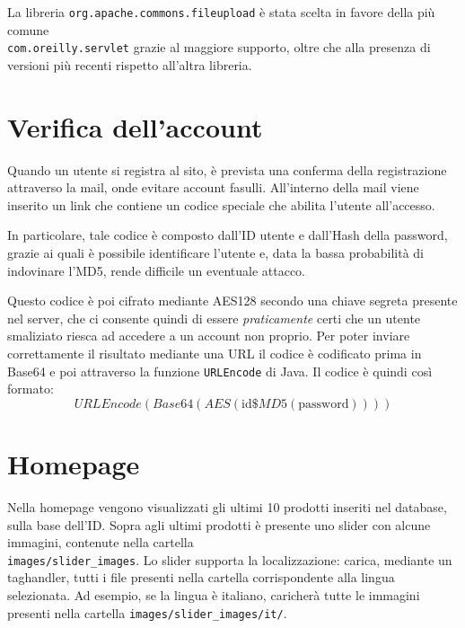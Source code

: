La libreria \texttt{org.apache.commons.fileupload} è stata scelta in favore della più comune \\\texttt{com.oreilly.servlet} grazie al maggiore supporto, oltre che alla presenza di versioni più recenti rispetto all'altra libreria.



\chapter{Verifica dell'account}

Quando un utente si registra al sito, è prevista una conferma della registrazione attraverso la mail, onde evitare account fasulli. All'interno della mail viene inserito un link che contiene un codice speciale che abilita l'utente all'accesso.

In particolare, tale codice è composto dall'ID utente e dall'Hash della password, grazie ai quali è possibile identificare l'utente e, data la bassa probabilità di indovinare l'MD5, rende difficile un eventuale attacco.

Questo codice è poi cifrato mediante AES128 secondo una chiave segreta presente nel server, che ci consente quindi di essere \textit{praticamente} certi che un utente smaliziato riesca ad accedere a un account non proprio. Per poter inviare correttamente il risultato mediante una URL il codice è codificato prima in Base64 e poi attraverso la funzione \texttt{URLEncode} di Java. Il codice è quindi così formato:
\[
    URLEncode( Base64( AES( \mbox{id}\$MD5(\mbox{password}))))
\]

\chapter{Homepage}
Nella homepage vengono visualizzati gli ultimi 10 prodotti inseriti nel database, sulla base dell'ID. Sopra agli ultimi prodotti è presente uno slider con alcune immagini, contenute nella cartella \\\texttt{images/slider\_images}. Lo slider supporta la localizzazione: carica, mediante un taghandler, tutti i file presenti nella cartella corrispondente alla lingua selezionata. Ad esempio, se la lingua è italiano, caricherà tutte le immagini presenti nella cartella \texttt{images/slider\_images/it/}.


